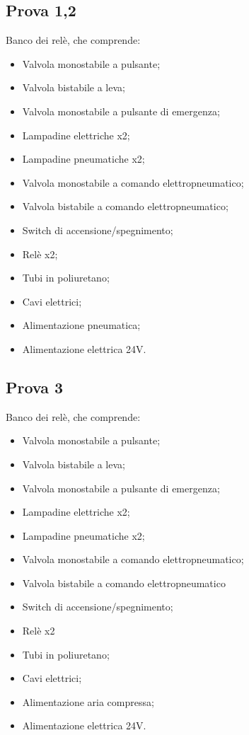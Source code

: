 \documentclass[a4paper]{article}
\begin{document}
\subsection{Prova 1,2}

Banco dei relè, che comprende:
\begin{itemize}
\item Valvola monostabile a pulsante;
\item Valvola bistabile a leva;
\item Valvola monostabile a pulsante di emergenza;
\item Lampadine elettriche x2;
\item Lampadine pneumatiche x2;
\item Valvola monostabile a comando elettropneumatico;
\item Valvola bistabile a comando elettropneumatico;
\item Switch di accensione/spegnimento;
\item Relè x2;
\item Tubi in poliuretano;
\item Cavi elettrici;
\item Alimentazione pneumatica;
\item Alimentazione elettrica 24V.
\end{itemize}


\subsection{Prova 3}
Banco dei relè, che comprende:
\begin{itemize}
\item Valvola monostabile a pulsante;
\item Valvola bistabile a leva;
\item Valvola monostabile a pulsante di emergenza;
\item Lampadine elettriche x2;
\item Lampadine pneumatiche x2;
\item Valvola monostabile a comando elettropneumatico;
\item Valvola bistabile a comando elettropneumatico
\item Switch di accensione/spegnimento;
\item Relè x2
\item Tubi in poliuretano;
\item Cavi elettrici;
\item Alimentazione aria compressa;
\item Alimentazione elettrica 24V.
\end{itemize}
\end{document}
